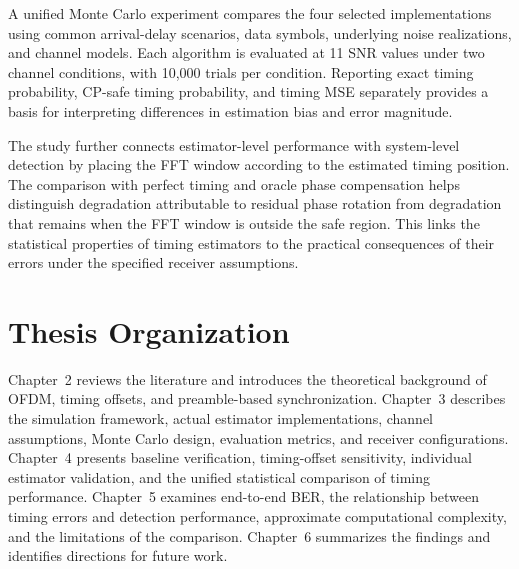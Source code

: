 A unified Monte Carlo experiment compares the four selected implementations using common arrival-delay scenarios, data symbols, underlying noise realizations, and channel models. Each algorithm is evaluated at 11 SNR values under two channel conditions, with 10,000 trials per condition. Reporting exact timing probability, CP-safe timing probability, and timing MSE separately provides a basis for interpreting differences in estimation bias and error magnitude.

The study further connects estimator-level performance with system-level detection by placing the FFT window according to the estimated timing position. The comparison with perfect timing and oracle phase compensation helps distinguish degradation attributable to residual phase rotation from degradation that remains when the FFT window is outside the safe region. This links the statistical properties of timing estimators to the practical consequences of their errors under the specified receiver assumptions.

\section{Thesis Organization}
Chapter~2 reviews the literature and introduces the theoretical background of OFDM, timing offsets, and preamble-based synchronization. Chapter~3 describes the simulation framework, actual estimator implementations, channel assumptions, Monte Carlo design, evaluation metrics, and receiver configurations. Chapter~4 presents baseline verification, timing-offset sensitivity, individual estimator validation, and the unified statistical comparison of timing performance. Chapter~5 examines end-to-end BER, the relationship between timing errors and detection performance, approximate computational complexity, and the limitations of the comparison. Chapter~6 summarizes the findings and identifies directions for future work.
